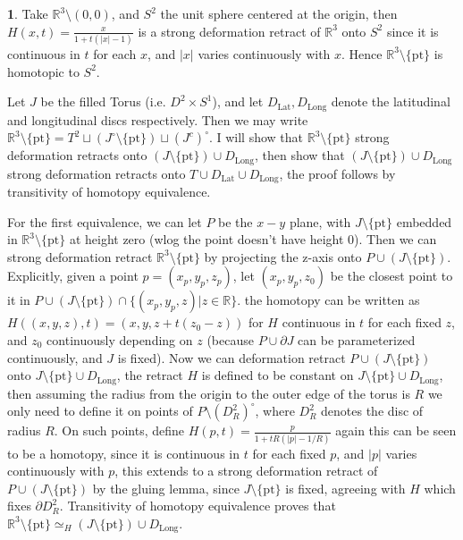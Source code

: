 \documentclass[10.5pt]{article}
\theoremstyle{definition}
\newtheorem{pb}{}
\newcommand{\set}[1]{\{#1\}}
\newcommand{\abs}[1]{\lvert#1\rvert}
\newcommand{\ism}{\simeq}
\begin{document}
    \begin{pb}
        Take \(\mathbb{R}^3 \setminus (0,0)\), and \(S^2\) the unit sphere centered at the origin, then \(H(x,t) = \frac{x}{1+t(\abs{x}-1)}\) is a strong deformation retract of
        \(\mathbb{R}^3\) onto \(S^2\) since it is continuous in \(t\) for each \(x\), and \(\abs{x}\) varies continuously with \(x\).
        Hence \(\mathbb{R}^3 \setminus \set{\text{pt}}\) is homotopic to \(S^2\).

        Let \(J \) be the filled Torus (i.e. \(D^2 \times S^1\)), and let \(D_\text{Lat}, D_\text{Long}\) denote the latitudinal and longitudinal discs respectively. 
        Then we may write \(\mathbb{R}^3 \setminus \set{\text{pt}} = T^2 \sqcup (J^\circ \setminus \set{\text{pt}}) \sqcup \left(J^c\right)^\circ\).
        I will show that \(\mathbb{R}^3 \setminus \set{\text{pt}}\) strong deformation retracts onto \((J \setminus \set{\text{pt}}) \cup D_\text{Long}\), then show that
        \((J \setminus \set{\text{pt}}) \cup D_\text{Long}\) strong deformation retracts onto \(T \cup D_\text{Lat} \cup D_\text{Long}\), the proof follows by transitivity of homotopy equivalence.

        For the first equivalence, we can let \(P\) be the \(x-y\) plane, with \(J \setminus \set{\text{pt}}\) embedded in \(\mathbb{R}^3 \setminus \set{\text{pt}}\) at height zero 
        (wlog the point doesn't have height 0). Then we can strong deformation retract \(\mathbb{R}^3 \setminus \set{\text{pt}}\) by projecting the z-axis onto \(P \cup (J \setminus \set{\text{pt}})\). 
        Explicitly, given a point \(p = (x_p,y_p,z_p)\), let \((x_p,y_p,z_0)\) be the closest point to it in \(P \cup (J \setminus \set{\text{pt}}) \cap \set{(x_p,y_p,z) \vert z \in \mathbb{R}}\).
        the homotopy can be written as \(H((x,y,z),t) = (x,y,z + t(z_0 - z))\) for \(H\) continuous in \(t\) for each fixed \(z\), and \(z_0\) 
        continuously depending on \(z\) (because \(P \cup \partial J\) can be parameterized continuously, and \(J\) is fixed). 
        Now we can deformation retract \(P \cup (J \setminus \set{\text{pt}})\) onto \(J \setminus \set{\text{pt}} \cup D_{\text{Long}}\),
        the retract \(H\) is defined to be constant on \(J \setminus \set{\text{pt}} \cup D_{\text{Long}}\), then assuming the radius from the origin to the outer edge of the torus is \(R\)
        we only need to define it on points of \(P \setminus (D^2_R)^\circ\), where \(D^2_R\) denotes the disc of radius \(R\). On such points, define \(H(p,t) = \frac{p}{1 + tR(\abs{p} - 1/R)}\)
        again this can be seen to be a homotopy, since it is continuous in \(t\) for each fixed \(p\), and \(\abs{p}\) varies continuously with \(p\), this extends to a strong deformation retract of 
        \(P \cup (J \setminus \set{\text{pt}})\) by the gluing lemma, since \(J \setminus \set{\text{pt}}\) is fixed, agreeing with \(H\) which fixes \(\partial D^2_R\).
        Transitivity of homotopy equivalence proves that \(\mathbb{R}^3 \setminus \set{\text{pt}} \ism_{H} (J \setminus \set{\text{pt}}) \cup D_\text{Long}\).
        

\end{pb}
\end{document}
